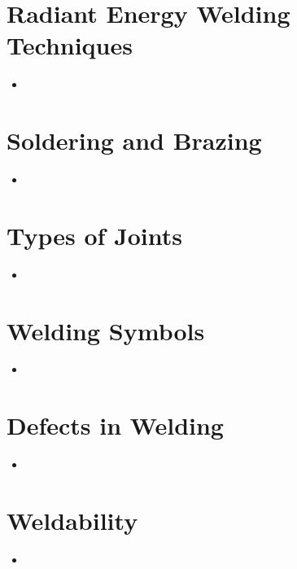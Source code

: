 \documentclass[8pt]{report}
\begin{document}
\section{Radiant Energy Welding Techniques}
	\begin{itemize}
		\item
	\end{itemize}\hrulefill
\section{Soldering and Brazing}
	\begin{itemize}
		\item
	\end{itemize}\hrulefill
\section{Types of Joints}
	\begin{itemize}
		\item
	\end{itemize}\hrulefill
\section{Welding Symbols}
	\begin{itemize}
		\item
	\end{itemize}\hrulefill
\section{Defects in Welding}
	\begin{itemize}
		\item
	\end{itemize}\hrulefill
\section{Weldability}
	\begin{itemize}
		\item
	\end{itemize}\hrulefill
\end{document}
